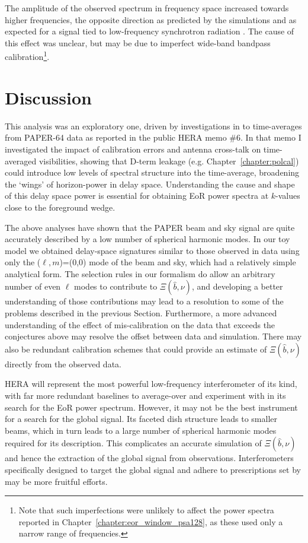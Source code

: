 The amplitude of the observed spectrum in frequency space increased towards higher frequencies, the opposite direction as predicted by the simulations and as expected for a signal tied to low-frequency synchrotron radiation \citep{Mozden.17}. The cause of this effect was unclear, but may be due to imperfect wide-band bandpass calibration\footnote{Note that such imperfections were unlikely to affect the power spectra reported in Chapter~\ref{chapter:eor_window_psa128}, as these used only a narrow range of frequencies.}.

\section{Discussion}

This analysis was an exploratory one, driven by investigations in to time-averages from PAPER-64 data as reported in the public HERA memo \#6. In that memo I investigated the impact of calibration errors and antenna cross-talk on time-averaged visibilities, showing that D-term leakage (e.g. Chapter~\ref{chapter:polcal}) could introduce low levels of spectral structure into the time-average, broadening the `wings' of horizon-power in delay space. Understanding the cause and shape of this delay space power is essential for obtaining EoR power spectra at $k$-values close to the foreground wedge.

The above analyses have shown that the PAPER beam and sky signal are quite accurately described by a low number of spherical harmonic modes. In our toy model we obtained delay-space signatures similar to those observed in data using only the ($\ell,m$)=(0,0) mode of the beam and sky, which had a relatively simple analytical form. The selection rules in our formalism do allow an arbitrary number of even $\ell$ modes to contribute to $\Xi(\hat{b},\nu)$, and developing a better understanding of those contributions may lead to a resolution to some of the problems described in the previous Section. Furthermore, a more advanced understanding of the effect of mis-calibration on the data that exceeds the conjectures above may resolve the offset between data and simulation. There may also be redundant calibration schemes that could provide an estimate of $\Xi(\hat{b},\nu)$ directly from the observed data.

HERA \citep{deBoer.17} will represent the most powerful low-frequency interferometer of its kind, with far more redundant baselines to average-over and experiment with in its search for the EoR power spectrum. However, it may not be the best instrument for a search for the global signal. Its faceted dish structure leads to smaller beams, which in turn leads to a large number of spherical harmonic modes required for its description. This complicates an accurate simulation of $\Xi(\hat{b},\nu)$ and hence the extraction of the global signal from observations. Interferometers specifically designed to target the global signal and adhere to prescriptions set by \cite{Venumadhav.16} may be more fruitful efforts.

